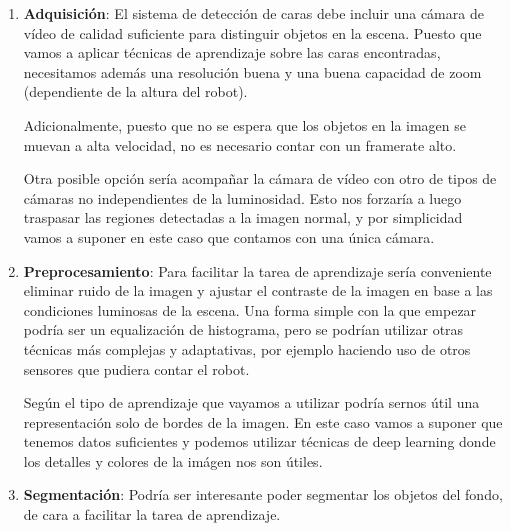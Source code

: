 \begin{enumerate}
    \item \textbf{Adquisición}: El sistema de detección de caras debe incluir una cámara de vídeo de calidad suficiente para distinguir objetos en la escena. Puesto que vamos a aplicar técnicas de aprendizaje sobre las caras encontradas, necesitamos además una resolución buena y una buena capacidad de zoom (dependiente de la altura del robot).
    
    Adicionalmente, puesto que no se espera que los objetos en la imagen se muevan a alta velocidad, no es necesario contar con un framerate alto.

    Otra posible opción sería acompañar la cámara de vídeo con otro de tipos de cámaras no independientes de la luminosidad. Esto nos forzaría a luego traspasar las regiones detectadas a la imagen normal, y por simplicidad vamos a suponer en este caso que contamos con una única cámara.

    \item \textbf{Preprocesamiento}: Para facilitar la tarea de aprendizaje sería conveniente eliminar ruido de la imagen y ajustar el contraste de la imagen en base a las condiciones luminosas de la escena. Una forma simple con la que empezar podría ser un equalización de histograma, pero se podrían utilizar otras técnicas más complejas y adaptativas, por ejemplo haciendo uso de otros sensores que pudiera contar el robot.
    
    Según el tipo de aprendizaje que vayamos a utilizar podría sernos útil una representación solo de bordes de la imagen. En este caso vamos a suponer que tenemos datos suficientes y podemos utilizar técnicas de deep learning donde los detalles y colores de la imágen nos son útiles.

    \item \textbf{Segmentación}:
    Podría ser interesante poder segmentar los objetos del fondo, de cara a facilitar la tarea de aprendizaje.
    
    
    


\end{enumerate}
